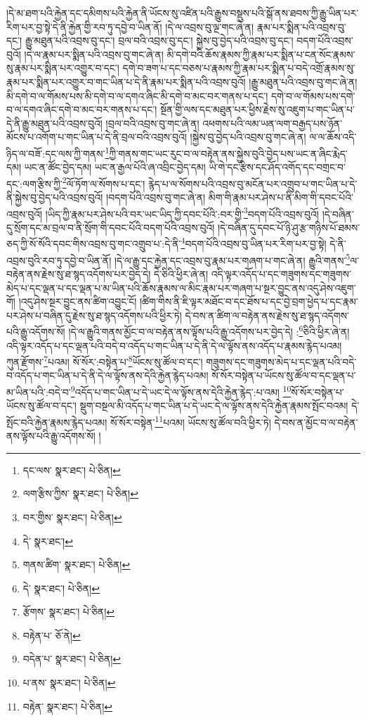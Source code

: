 །དེ་མ་ཐག་པའི་རྐྱེན་དང་དམིགས་པའི་རྐྱེན་ནི་ཡོངས་སུ་འཛིན་པའི་རྒྱུས་བསྡུས་པའི་སྒོ་ནས་ཐབས་ཀྱི་རྒྱུ་ཡིན་པར་རིག་པར་བྱ་སྟེ་དེ་ནི་རྐྱེན་གྱི་རབ་ཏུ་དབྱེ་བ་ཡིན་ནོ། །དེ་ལ་འབྲས་བུ་ལྔ་གང་ཞེ་ན། རྣམ་པར་སྨིན་པའི་འབྲས་བུ་དང་། རྒྱུ་མཐུན་པའི་འབྲས་བུ་དང་། བྲལ་བའི་འབྲས་བུ་དང་། སྐྱེས་བུ་བྱེད་པའི་འབྲས་བུ་དང་། བདག་པོའི་འབྲས་བུའོ། །དེ་ལ་རྣམ་པར་སྨིན་པའི་འབྲས་བུ་གང་ཞེ་ན། མི་དགེ་བའི་ཆོས་རྣམས་ཀྱི་རྣམ་པར་སྨིན་པ་ངན་སོང་རྣམས་སུ་རྣམ་པར་སྨིན་པར་འགྱུར་བ་དང་། དགེ་བ་ཟག་པ་དང་བཅས་པ་རྣམས་ཀྱི་རྣམ་པར་སྨིན་པ་བདེ་འགྲོ་རྣམས་སུ་རྣམ་པར་སྨིན་པར་འགྱུར་བ་གང་ཡིན་པ་དེ་ནི་རྣམ་པར་སྨིན་པའི་འབྲས་བུའོ། །རྒྱུ་མཐུན་པའི་འབྲས་བུ་གང་ཞེ་ན། མི་དགེ་བ་ལ་གོམས་པས་མི་དགེ་བ་ལ་དགའ་ཞིང་མི་དགེ་བ་མང་བར་གནས་པ་དང་། དགེ་བ་ལ་གོམས་པས་དགེ་བ་ལ་དགའ་ཞིང་དགེ་བ་མང་བར་གནས་པ་དང་། སྔོན་གྱི་ལས་དང་མཐུན་པར་ཕྱིས་རྗེས་སུ་འཇུག་པ་གང་ཡིན་པ་དེ་ནི་རྒྱུ་མཐུན་པའི་འབྲས་བུའོ། །བྲལ་བའི་འབྲས་བུ་གང་ཞེ་ན། འཕགས་པའི་ལམ་ཡན་ལག་བརྒྱད་པས་ཉོན་མོངས་པ་འགོག་པ་གང་ཡིན་པ་དེ་ནི་བྲལ་བའི་འབྲས་བུའོ། །སྐྱེས་བུ་བྱེད་པའི་འབྲས་བུ་གང་ཞེ་ན། ལ་ལ་ཆོས་འདི་ཉིད་ལ་བཟོ་:དང་ལས་ཀྱི་གནས་\footnote{དང་ལས་  སྣར་ཐང་།  པེ་ཅིན། }ཀྱི་གནས་གང་ཡང་རུང་བ་ལ་བརྟེན་ནས་སྐྱེས་བུའི་བྱེད་པས་ཡང་ན་ཞིང་རྨེད་དམ། ཡང་ན་ཚོང་བྱེད་དམ། ཡང་ན་རྒྱལ་པོའི་ཞ་འབྲིང་བྱེད་དམ། ཡི་གེ་དང་རྩིས་དང་ཤོད་འགོད་དང་བགྲང་བ་དང་:ལག་རྩིས་ཀྱི་\footnote{ལག་རྩིས་ཀྱིས་  སྣར་ཐང་།  པེ་ཅིན། }ལོ་ཏོག་ལ་སོགས་པ་དང་། རྙེད་པ་ལ་སོགས་པའི་འབྲས་བུ་མངོན་པར་འགྲུབ་པ་གང་ཡིན་པ་དེ་ནི་སྐྱེས་བུ་བྱེད་པའི་འབྲས་བུའོ། །བདག་པོའི་འབྲས་བུ་གང་ཞེ་ན། མིག་གི་རྣམ་པར་ཤེས་པ་ནི་མིག་གི་དབང་པོའི་འབྲས་བུའོ། །ཡིད་ཀྱི་རྣམ་པར་ཤེས་པའི་བར་ཡང་ཡིད་ཀྱི་དབང་པོའི་:བར་གྱི་\footnote{བར་གྱིས་  སྣར་ཐང་།  པེ་ཅིན། }བདག་པོའི་འབྲས་བུའོ། །དེ་བཞིན་དུ་སྲོག་དང་མ་བྲལ་བ་ནི་སྲོག་གི་དབང་པོའི་བདག་པོའི་འབྲས་བུའོ། །དེ་བཞིན་དུ་དབང་པོ་ཉི་ཤུ་རྩ་གཉིས་པོ་ཐམས་ཅད་ཀྱི་སོ་སོའི་དབང་གིས་འབྲས་བུ་གང་འགྲུབ་པ་:དེ་ནི་\footnote{དེ་  སྣར་ཐང་། }བདག་པོའི་འབྲས་བུ་ཡིན་པར་རིག་པར་བྱ་སྟེ། དེ་ནི་འབྲས་བུའི་རབ་ཏུ་དབྱེ་བ་ཡིན་ནོ། །དེ་ལ་རྒྱུ་དང་རྐྱེན་དང་འབྲས་བུ་རྣམ་པར་གཞག་པ་གང་ཞེ་ན། རྒྱུའི་གནས་\footnote{གནས་ཚིག་  སྣར་ཐང་།  པེ་ཅིན། }ལ་བརྟེན་ནས་རྗེས་སུ་ཐ་སྙད་འདོགས་པར་བྱེད་དེ། དེ་ཅིའི་ཕྱིར་ཞེ་ན། འདི་ལྟར་འདོད་པ་དང་གཟུགས་དང་གཟུགས་མེད་པ་དང་ལྡན་པ་དང་ལྡན་པ་མ་ཡིན་པའི་ཆོས་རྣམས་ལ་མིང་རྣམ་པར་གཞག་པ་སྔར་བྱུང་ནས་འདུ་ཤེས་འཇུག་གོ། །འདུ་ཤེས་སྔར་བྱུང་ནས་ཚིག་འབྱུང་ངོ། །ཚིག་གིས་ནི་ཇི་ལྟར་མཐོང་བ་དང་ཐོས་པ་དང་བྱེ་བྲག་ཕྱེད་པ་དང་རྣམ་པར་ཤེས་པ་བཞིན་དུ་རྗེས་སུ་ཐ་སྙད་འདོགས་པའི་ཕྱིར་ཏེ། དེ་བས་ན་ཚིག་ལ་བརྟེན་ནས་རྗེས་སུ་ཐ་སྙད་འདོགས་པའི་རྒྱུ་འདོགས་སོ། །དེ་ལ་རྒྱུའི་གནས་མྱོང་བ་ལ་བརྟེན་ནས་ལྟོས་པའི་རྒྱུ་འདོགས་པར་བྱེད་དེ། :\footnote{དེ་  སྣར་ཐང་།  པེ་ཅིན། }ཅིའི་ཕྱིར་ཞེ་ན། འདི་ལྟར་འདོད་པ་དང་ལྡན་པའི་བདེ་བ་འདོད་པ་གང་ཡིན་པ་དེ་ནི་དེ་ལ་ལྟོས་ནས་འདོད་པ་རྣམས་རྙེད་པའམ། ཀུན་རྫོགས་\footnote{རྩོགས་  སྣར་ཐང་།  པེ་ཅིན། }པའམ། སོ་སོར་:བསྟེན་པ་\footnote{བརྟེན་པ་  ཅོ་ནེ། }ཡོངས་སུ་ཚོལ་བ་དང་། གཟུགས་དང་གཟུགས་མེད་པ་དང་ལྡན་པའི་བདེ་བ་འདོད་པ་གང་ཡིན་པ་དེ་ནི་དེ་ལ་ལྟོས་ནས་དེའི་རྐྱེན་རྙེད་པའམ། སོ་སོར་བསྟེན་པ་ཡོངས་སུ་ཚོལ་བ་དང་ལྡན་པ་མ་ཡིན་པའི་:བདེ་བ་\footnote{བདེན་པ་  སྣར་ཐང་།  པེ་ཅིན། }འདོད་པ་གང་ཡིན་པ་དེ་ཡང་དེ་ལ་ལྟོས་ནས་དེའི་རྐྱེན་རྙེད་:པ་འམ། \footnote{པ་ནས་  སྣར་ཐང་།  པེ་ཅིན། }སོ་སོར་བསྟེན་པ་ཡོངས་སུ་ཚོལ་བ་དང་། སྡུག་བསྔལ་མི་འདོད་པ་གང་ཡིན་པ་དེ་ཡང་དེ་ལ་ལྟོས་ནས་དེའི་རྐྱེན་རྣམས་སྤོང་བའམ། དེ་སྤོང་བའི་རྐྱེན་རྣམས་རྙེད་པའམ། སོ་སོར་བསྟེན་\footnote{བརྟེན་  སྣར་ཐང་།  པེ་ཅིན། }པའམ། ཡོངས་སུ་ཚོལ་བའི་ཕྱིར་ཏེ། དེ་བས་ན་མྱོང་བ་ལ་བརྟེན་ནས་ལྟོས་པའི་རྒྱུ་འདོགས་སོ། །
